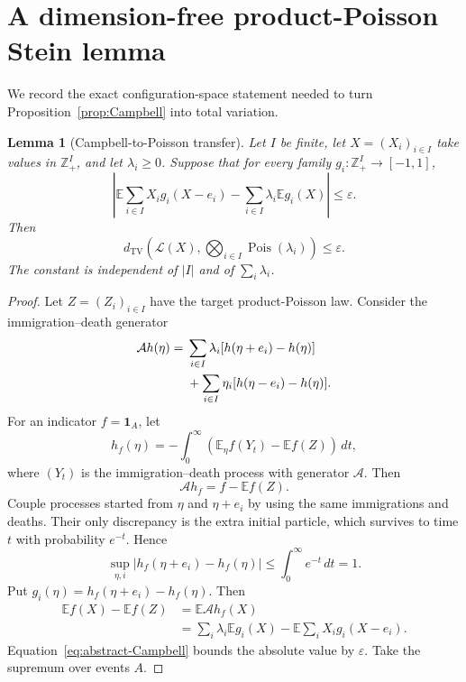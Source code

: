 \documentclass[11pt]{article}
\newtheorem{lemma}[theorem]{Lemma}
\theoremstyle{definition}
\theoremstyle{remark}
\newcommand{\Ee}{\mathbb E}
\newcommand{\one}{\mathbf 1}
\newcommand{\dd}{\,d}
\newcommand{\Pois}{\operatorname{Pois}}
\newcommand{\TV}{\mathrm{TV}}
\newcommand{\cL}{\mathcal L}
\newcommand{\cA}{\mathcal A}
\newcommand{\Z}{\mathbb Z}
\begin{document}
\section{A dimension-free product-Poisson Stein lemma}

We record the exact configuration-space statement needed to turn
Proposition~\ref{prop:Campbell} into total variation.

\begin{lemma}[Campbell-to-Poisson transfer]
\label{lem:Stein}
Let $I$ be finite, let $X=(X_i)_{i\in I}$ take values in $\Z_+^I$, and let
$\lambda_i\ge0$.  Suppose that for every family
$g_i:\Z_+^I\to[-1,1]$,
\begin{equation}\label{eq:abstract-Campbell}
 \left|
 \Ee\sum_{i\in I}X_i g_i(X-e_i)
 -\sum_{i\in I}\lambda_i\Ee g_i(X)
 \right|\le\varepsilon.
\end{equation}
Then
\begin{equation}\label{eq:Stein-TV}
 d_{\TV}\left(
 \cL(X),\bigotimes_{i\in I}\Pois(\lambda_i)
 \right)\le\varepsilon.
\end{equation}
The constant is independent of $|I|$ and of $\sum_i\lambda_i$.
\end{lemma}

\begin{proof}
Let $Z=(Z_i)_{i\in I}$ have the target product-Poisson law.  Consider the
immigration--death generator
\begin{align}
 \cA h(\eta)
 ={}&\sum_{i\in I}\lambda_i[h(\eta+e_i)-h(\eta)]
 \notag\\
 &+\sum_{i\in I}\eta_i[h(\eta-e_i)-h(\eta)].
 \label{eq:ID-generator}
\end{align}
For an indicator $f=\one_A$, let
\begin{equation}\label{eq:Stein-solution}
 h_f(\eta)=-\int_0^\infty
 \left(\Ee_\eta f(Y_t)-\Ee f(Z)\right)\dd t,
\end{equation}
where $(Y_t)$ is the immigration--death process with generator $\cA$.
Then
\[
 \cA h_f=f-\Ee f(Z).
\]
Couple processes started from $\eta$ and $\eta+e_i$ by using the same
immigrations and deaths.  Their only discrepancy is the extra initial
particle, which survives to time $t$ with probability $e^{-t}$.  Hence
\begin{equation}\label{eq:Stein-factor}
 \sup_{\eta,i}|h_f(\eta+e_i)-h_f(\eta)|
 \le\int_0^\infty e^{-t}\dd t=1.
\end{equation}
Put $g_i(\eta)=h_f(\eta+e_i)-h_f(\eta)$.  Then
\begin{align*}
 \Ee f(X)-\Ee f(Z)
 &=\Ee\cA h_f(X)\\
 &=\sum_i\lambda_i\Ee g_i(X)
 -\Ee\sum_iX_i g_i(X-e_i).
\end{align*}
Equation~\eqref{eq:abstract-Campbell} bounds the absolute value by
$\varepsilon$.  Take the supremum over events $A$.
\end{proof}
\end{document}
